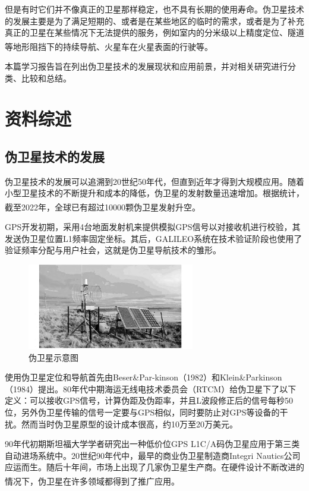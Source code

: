\documentclass[12pt, a4paper, oneside]{ctexart}
\newcommand{\upcite}[1]{\textsuperscript{\cite{#1}}}
\begin{document}
但是有时它们并不像真正的卫星那样稳定，也不具有长期的使用寿命。伪卫星技术的发展主要是为了满足短期的、或者是在某些地区的临时的需求，或者是为了补充真正的卫星在某些情况下无法提供的服务，例如室内的分米级以上精度定位、隧道等地形阻挡下的持续导航、火星车在火星表面的行驶等。\upcite{01,001}

本篇学习报告旨在列出伪卫星技术的发展现状和应用前景，并对相关研究进行分类、比较和总结。

\section{资料综述}

\subsection{伪卫星技术的发展}

伪卫星技术的发展可以追溯到20世纪50年代，但直到近年才得到大规模应用。随着小型卫星技术的不断提升和成本的降低，伪卫星的发射数量迅速增加。根据统计，截至2022年，全球已有超过10000颗伪卫星发射升空。\upcite{07}

GPS开发初期，采用4台地面发射机来提供模拟GPS信号以对接收机进行校验，其发送伪卫星位置L1频率固定坐标。其后，GALILEO系统在技术验证阶段也使用了验证频率分配与用户社会，这就是伪卫星导航技术的雏形。

\begin{figure}[ht]
  \centering
  \includegraphics[width=0.65\textwidth]{img/wei.png}
  \caption{伪卫星示意图}
  \label{yuanjian}
\end{figure}

使用伪卫星定位和导航首先由Beser{\&}Par-kinson（1982）和Klein{\&}Parkinson（1984）提出。80年代中期海运无线电技术委员会（RTCM）给伪卫星下了以下定义：可以接收GPS信号，计算伪距及伪距率，并且L波段修正后的信号每秒50位，另外伪卫星传输的信号一定要与GPS相似，同时要防止对GPS等设备的干扰。然而当时伪卫星原型的设计成本很高，约10万至20万美元。

90年代初期斯坦福大学学者研究出一种低价位GPS L1C/A码伪卫星应用于第三类自动进场系统中。20世纪90年代中，最早的商业伪卫星制造商Integri Nautics公司应运而生。随后十年间，市场上出现了几家伪卫星生产商。在硬件设计不断改进的情况下，伪卫星在许多领域都得到了推广应用。\upcite{001}
\end{document}
